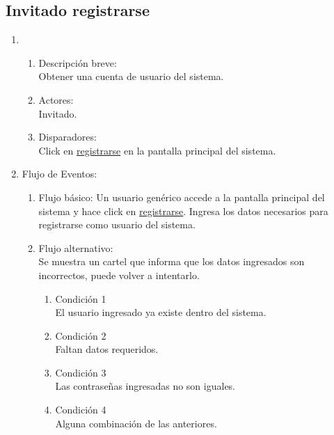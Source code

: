\documentclass[a4paper,11pt]{article}
\begin{document}
\subsection{Invitado registrarse}
\begin{enumerate}

    \item
        \begin{enumerate}
            \item Descripci\'on breve: \\
                Obtener una cuenta de usuario del sistema.
            \item Actores: \\
                Invitado.
            \item Disparadores: \\
                Click en \underline{registrarse} en la pantalla principal del sistema.

        \end{enumerate}

    \item Flujo de Eventos:

        \begin{enumerate}
            \item Flujo b\'asico:
                Un usuario gen\'erico accede a la pantalla principal del sistema y
                hace click en \underline{registrarse}. Ingresa los datos necesarios
                para registrarse como usuario del sistema.

            \item Flujo alternativo:\\
                Se muestra un cartel que informa que los datos ingresados son
                incorrectos, puede volver a intentarlo.

                \begin{enumerate}
                    \item Condici\'on 1 \\
                            El usuario ingresado ya existe dentro del sistema.
                    \item Condici\'on 2 \\
                            Faltan datos requeridos.
                    \item Condici\'on 3 \\
                            Las contrase\~nas ingresadas no son iguales.
                    \item Condici\'on 4 \\
                            Alguna combinaci\'on de las anteriores.
                \end{enumerate}
	\end{enumerate}


\end{enumerate}
\end{document}
